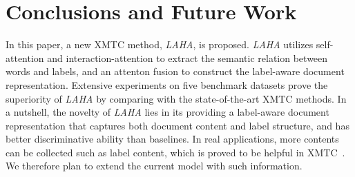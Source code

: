 \documentclass[runningheads]{llncs}
\begin{document}
\vspace{-4mm}
\section{Conclusions and Future Work}
In this paper, a new XMTC method, \textit{LAHA}, is proposed. \textit{LAHA} utilizes self-attention and interaction-attention to extract the semantic relation between words and labels, and an attenton fusion to construct the label-aware document representation. Extensive experiments on five benchmark datasets prove the superiority of \textit{LAHA} by comparing with the state-of-the-art XMTC methods.
In a nutshell, the novelty of \textit{LAHA} lies in its providing a label-aware document representation that captures both document content and label structure, and has better discriminative ability than baselines.
In real applications, more contents can be collected such as label content, which is proved to be helpful in XMTC~\cite{ref_article8}. We therefore plan to extend the current model with such information. 
\end{document}
